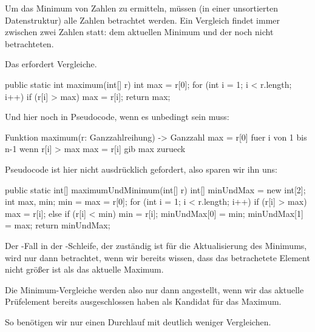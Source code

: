 \begin{aufgabe}%
\begin{teile}	
	\item
	Um das Minimum von  Zahlen zu ermitteln, müssen (in einer unsortierten Datenstruktur) alle Zahlen betrachtet werden. Ein Vergleich findet immer zwischen zwei Zahlen statt: dem aktuellen Minimum und der noch nicht betrachteten. 
	
	Das erfordert  Vergleiche. \\
	
	\item
	\begin{java}
	public static int maximum(int[] r) {
	    int max = r[0];
	    for (int i = 1; i < r.length; i++)
	        if (r[i] > max) 
	            max = r[i]; 
	    return max;
	}
	\end{java}
	
	Und hier noch in Pseudocode, wenn es unbedingt sein muss:
	\begin{java}
	Funktion maximum(r: Ganzzahlreihung) -> Ganzzahl {
       max = r[0]
       fuer i von 1 bis n-1
           wenn r[i] > max
               max = r[i]
       gib max zurueck
   }   
	\end{java}
	
	\newpage
	\item
	Pseudocode ist hier nicht ausdrücklich gefordert, also sparen wir ihn uns: 
	\begin{java}
	public static int[] maximumUndMinimum(int[] r) {
	    int[] minUndMax = new int[2];
	    int max, min;
	    min = max = r[0];
	    for (int i = 1; i < r.length; i++) {
	        if      (r[i] > max) max = r[i]; 
	        else if (r[i] < min) min = r[i];
	    }
	    minUndMax[0] = min;
	    minUndMax[1] = max;
	    return minUndMax;
	}
	\end{java} 
	
	Der -Fall in der -Schleife, der zuständig ist für die Aktualisierung des Minimums, wird nur dann betrachtet, wenn wir bereits wissen, dass das betrachetete Element nicht größer ist als das aktuelle Maximum.
	 
	Die Minimum-Vergleiche werden also nur dann angestellt, wenn wir das aktuelle Prüfelement bereits ausgeschlossen haben als Kandidat für das Maximum.
	
	So benötigen wir nur einen Durchlauf mit deutlich weniger Vergleichen. 
	
	
\end{teile}
\end{aufgabe}

